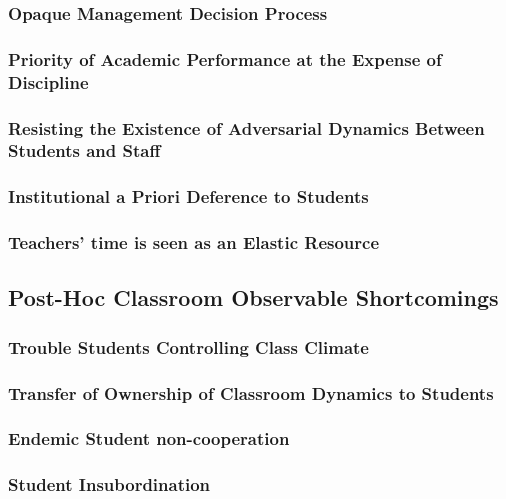\documentclass[12pt]{article}
\begin{document}
	\subsubsection{Opaque Management Decision Process}
	\subsubsection{Priority of Academic Performance at the Expense of Discipline}
	\subsubsection{Resisting the Existence of Adversarial Dynamics Between Students and Staff}
	\subsubsection{Institutional a Priori Deference to Students}
	\subsubsection{Teachers' time is seen as an Elastic Resource}

	\subsection{Post-Hoc Classroom Observable Shortcomings}
	\subsubsection{Trouble Students Controlling Class Climate}
	\subsubsection{Transfer of Ownership of Classroom Dynamics to Students}
	\subsubsection{Endemic Student non-cooperation}
	\subsubsection{Student Insubordination}
	
\end{document}
